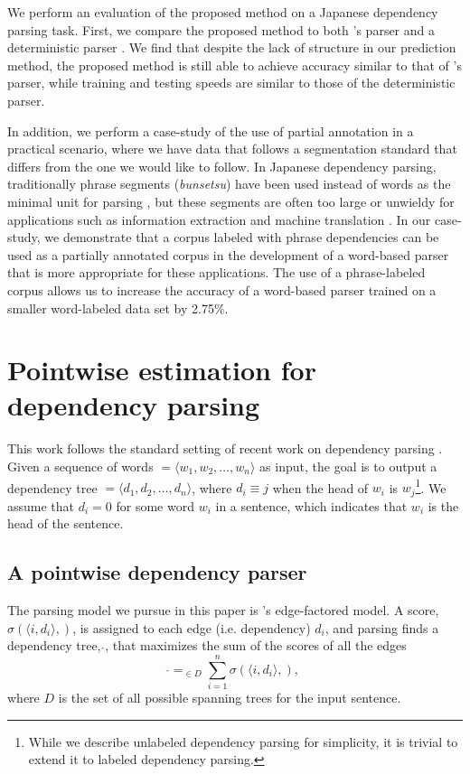 \documentclass[english]{jnlp_1.4}
\def\Bdma#1{}
\def\argmax{}
\begin{document}
We perform an evaluation of the proposed method on a Japanese dependency parsing task.  First, we
compare the proposed method to both 's parser and a deterministic parser
\cite{nivre2004deterministic}.  We find that despite the lack of structure in our prediction method,
the proposed method is still able to achieve accuracy similar to that of 's
parser, while training and testing speeds are similar to those of the deterministic parser.

In addition, we perform a case-study of the use of partial annotation in a practical scenario, where
we have data that follows a segmentation standard that differs from the one we would like to follow.
In Japanese dependency parsing, traditionally phrase segments ({\it bunsetsu}) have been used
instead of words as the minimal unit for parsing \cite{kudo2002,sassano2010using}, but these
segments are often too large or unwieldy for applications such as information extraction and
machine translation \cite{nakazawa08linguistically}.  In our case-study, we demonstrate that a
corpus labeled with phrase dependencies can be used as a partially annotated corpus in the
development of a word-based parser that is more appropriate for these applications.  The use of a
phrase-labeled corpus allows us to increase the accuracy of a word-based parser trained on a smaller
word-labeled data set by 2.75\%.


\section{Pointwise estimation for dependency parsing}

This work follows the standard setting of recent work on dependency
parsing \cite{buchholz2006}.  Given a sequence of words
$\Bdma{w}=\langle w_1,w_2,\ldots,w_n\rangle$ as input, the goal is to
output a dependency tree $\Bdma{d}=\langle d_1,d_2,\ldots,d_n\rangle$,
where $d_i\equiv j$ when the head of $w_i$ is $w_j$\footnote{While we
describe unlabeled dependency parsing for simplicity, it is trivial to
extend it to labeled dependency parsing.}.  We assume that $d_i=0$ for
some word $w_i$ in a sentence, which indicates that $w_i$ is the head
of the sentence.


\subsection{A pointwise dependency parser}
\label{sec:pointwisemst}

The parsing model we pursue in this paper is
's edge-factored model.  A score,
$\sigma(\langle i, d_i \rangle, \Bdma{w})$, is assigned to each edge (i.e. dependency) $d_i$, and
parsing finds a dependency tree, $\hat{\Bdma{d}}$, that
maximizes the sum of the scores of all the edges
\begin{equation}
\hat{\Bdma{d}}=\argmax_{\Bdma{d} \in D}\sum \limits_{i=1}^n\sigma(\langle i, d_i \rangle, \Bdma{w}),
\end{equation}
where $D$ is the set of all possible spanning trees for the input
sentence.
\end{document}
